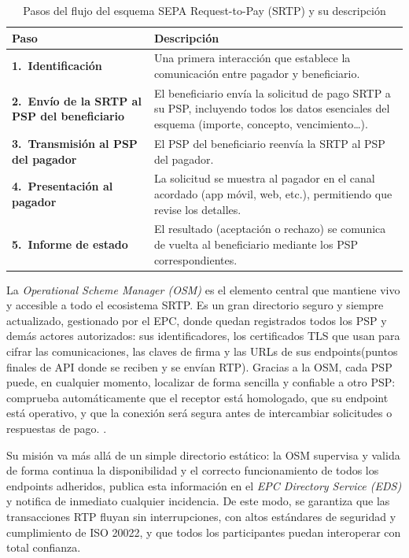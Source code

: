 \begin{table}[htbp]
  \centering
  \renewcommand{\arraystretch}{1.2} %
  \caption{Pasos del flujo del esquema SEPA Request-to-Pay (SRTP) y su descripción}
  \label{tab:srtp-steps-a}
  \begin{tabularx}{\textwidth}{@{} >{\bfseries}l  X @{}}
    \toprule
    Paso  & Descripción \\
    \midrule
    1.\ Identificación
      & Una primera interacción que establece la comunicación entre pagador y beneficiario. \\
    2.\ Envío de la SRTP al PSP del beneficiario
      & El beneficiario envía la solicitud de pago SRTP a su PSP, incluyendo todos los datos esenciales del esquema (importe, concepto, vencimiento…). \\
    3.\ Transmisión al PSP del pagador
      & El PSP del beneficiario reenvía la SRTP al PSP del pagador. \\
    4.\ Presentación al pagador
      & La solicitud se muestra al pagador en el canal acordado (app móvil, web, etc.), permitiendo que revise los detalles. \\
    5.\ Informe de estado
      & El resultado (aceptación o rechazo) se comunica de vuelta al beneficiario mediante los PSP correspondientes. \\
    \bottomrule
  \end{tabularx}
\end{table}

La \textit{Operational Scheme Manager (OSM)} es el elemento central que mantiene vivo y accesible a todo el ecosistema SRTP. Es un gran directorio seguro y siempre actualizado, gestionado por el EPC, donde quedan registrados todos los PSP y demás actores autorizados: sus identificadores, los certificados TLS que usan para cifrar las comunicaciones, las claves de firma y las URLs de sus endpoints(puntos finales de API donde se reciben y se envían RTP). Gracias a la OSM, cada PSP puede, en cualquier momento, localizar de forma sencilla y confiable a otro PSP: comprueba automáticamente que el receptor está homologado, que su endpoint está operativo, y que la conexión será segura antes de intercambiar solicitudes o respuestas de pago. \cite{epc098_2021}.

Su misión va más allá de un simple directorio estático: la OSM supervisa y valida de forma continua la disponibilidad y el correcto funcionamiento de todos los endpoints adheridos, publica esta información en el \textit{EPC Directory Service (EDS)} y notifica de inmediato cualquier incidencia. De este modo, se garantiza que las transacciones RTP fluyan sin interrupciones, con altos estándares de seguridad y cumplimiento de ISO 20022, y que todos los participantes puedan interoperar con total confianza.

